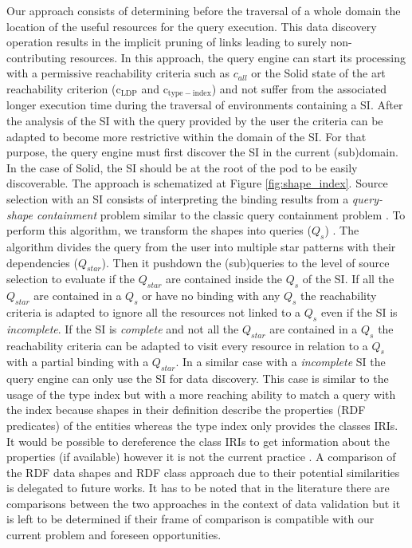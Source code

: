 Our approach consists of determining before the traversal of a whole domain  the location of the useful resources for the query execution.
This data discovery operation results in the implicit pruning of links leading to surely non-contributing resources.
In this approach, the query engine can start its processing with a permissive reachability criteria
such as $c_{all}$ \cite{Hartig2012} or the Solid state of the art reachability criterion ($\mathrm{c_{LDP}}$ and $\mathrm{c_{type-index}}$) \cite{Taelman2023}
and not suffer from the associated longer execution time during the traversal of environments containing a SI.
After the analysis of the SI with the query provided by the user the criteria can be adapted to become more restrictive within the domain of the SI.
For that purpose, the query engine must first discover the SI in the current (sub)domain.
In the case of Solid, the SI should be at the root of the pod to be easily discoverable.
The approach is schematized at Figure \ref{fig:shape_index}.
Source selection with an SI consists of interpreting the binding results from a \emph{query-shape containment} problem similar to the classic query containment problem \cite{afariQCE, Spasi2023}.
To perform this algorithm, we transform the shapes into queries ($Q_{s}$) \cite{labragayo2017validating, Delva2021}.
The algorithm divides the query from the user into multiple star patterns with their dependencies ($Q_{star}$).
Then it pushdown \cite{Yang2021FlexPushdownDBHP} the (sub)queries to the level of source selection to evaluate if the $Q_{star}$ are contained inside the $Q_s$ of the SI.
If all the $Q_{star}$ are contained in a $Q_{s}$ or have no binding with any $Q_{s}$
the reachability criteria is adapted to ignore all the resources not linked to a $Q_{s}$ even if the SI is \emph{incomplete}.
If the SI is \emph{complete} and not all the $Q_{star}$ are contained in a $Q_{s}$ the reachability criteria can be adapted
to visit every resource in relation to a $Q_{s}$ with a partial binding with a $Q_{star}$.
In a similar case with a \emph{incomplete} SI the query engine can only use the SI for data discovery.
This case is similar to the usage of the type index but with a more reaching ability to match a query with the index 
because shapes in their definition describe the properties (RDF predicates) of the entities whereas the type index only provides the classes IRIs.
It would be possible to dereference the class IRIs to get information about the properties (if available) however it is not the current practice \cite{Taelman2023}.
A comparison of the RDF data shapes and RDF class approach due to their potential similarities is delegated to future works.
It has to be noted that in the literature \cite{demeester_swj_2021} there are comparisons 
between the two approaches in the context of data validation but it is left to be determined if their frame of comparison is compatible with our current problem
and foreseen opportunities.


